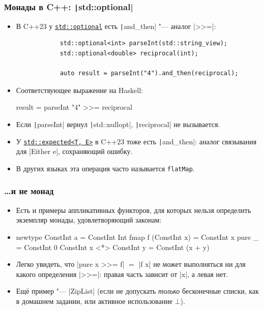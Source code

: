 \documentclass[11pt]{beamer}
\begin{document}
\begin{frame}[fragile]
  \frametitle{Монады в C++: \texttt|std::optional|}
  \begin{itemize}
    \item В C++23 у \href{https://eel.is/c++draft/optional.monadic}{\texttt{std::optional}} есть \texttt|and_then| "--- аналог \haskinline|>>=|:
          \begin{verbatim}
            std::optional<int> parseInt(std::string_view);
            std::optional<double> reciprocal(int);

            auto result = parseInt("4").and_then(reciprocal);
          \end{verbatim}
          \pause
    \item Соответствующее выражение на Haskell:
          \begin{haskellsmall}
            result = parseInt "4" >>= reciprocal
          \end{haskellsmall}
    \item Если \texttt|parseInt| вернул \texttt|std::nullopt|, \texttt|reciprocal| не вызывается.
    \item У \href{https://eel.is/c++draft/expected.object.monadic}{\texttt{std::expected<T, E>}} в C++23 тоже есть \texttt|and_then|: аналог связывания для \haskinline|Either e|, сохраняющий ошибку.
    \item В других языках эта операция часто называется \texttt{flatMap}.
  \end{itemize}
\end{frame}

\begin{frame}[fragile]
  \frametitle{\ldots и не монад}
  \begin{itemize}
    \item Есть и примеры аппликативных функторов, для которых нельзя определить экземпляр монады, удовлетворяющий законам:
    \item
          \begin{haskell}
            newtype ConstInt a = ConstInt Int
            fmap f (ConstInt x) = ConstInt x
            pure _ = ConstInt 0
            ConstInt x <*> ConstInt y = ConstInt (x + y)
          \end{haskell}
    \item Легко увидеть, что \haskinline|pure x >>= f| $=$ \haskinline|f x| не может выполняться ни для какого определения \haskinline|>>=|: \pause правая часть зависит от \haskinline|x|, а левая нет.
          \pause
    \item Ещё пример "--- \haskinline|ZipList| (если не допускать \emph{только} бесконечные списки, как в домашнем задании, или активное использование $\bot$).
  \end{itemize}
\end{frame}
\end{document}
